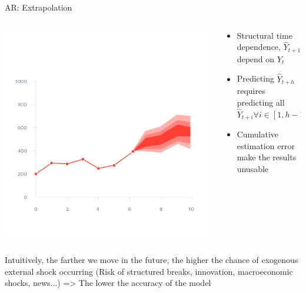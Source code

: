 \documentclass{beamer}
\begin{document}
\begin{frame}{AR: Extrapolation}
    \begin{columns}
        \begin{column}{.5\textwidth}
        \centering
        \includegraphics[width=\textwidth]{static/course_2_img/AR_Extrapolation.png}
        \end{column}
        
        \begin{column}{.5\textwidth}
        \begin{itemize}
            \item Structural time dependence, $\hat{Y}_{t+1}$ depend on $Y_{t}$
            \item Predicting $\hat{Y}_{t+h}$ requires predicting all $\hat{Y}_{t+i} \forall i \in [1,h-1]$
            \item Cumulative estimation error make the results unusable
        \end{itemize}        
        \end{column}
                 
    \end{columns}
Intuitively, the farther we move in the future,
    the higher the chance of exogenous external shock occurring (Risk of structured breaks, innovation, macroeconomic shocks, news...)
    => The lower the accuracy of the model        
\end{frame}
   
\end{document}
